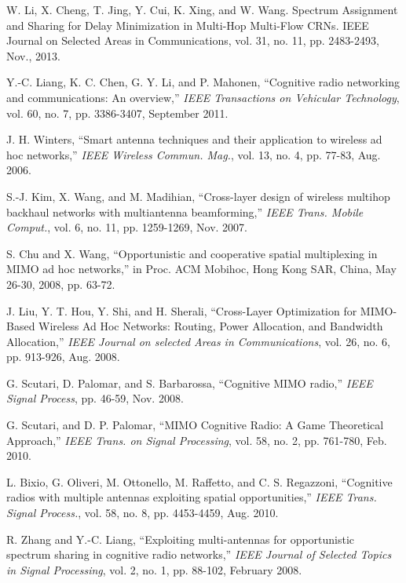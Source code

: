 \documentclass[12pt,onecolumn,tworows]{IEEEtran}
\begin{document}
\begin{thebibliography}{1}
W. Li, X. Cheng, T. Jing, Y. Cui, K. Xing, and W. Wang. Spectrum Assignment and Sharing for Delay Minimization in Multi-Hop Multi-Flow CRNs. IEEE Journal on Selected Areas in Communications, vol. 31, no. 11, pp. 2483-2493, Nov., 2013.

Y.-C. Liang, K. C. Chen, G. Y. Li, and P. Mahonen, ``Cognitive radio networking and communications: An overview,'' {\em IEEE Transactions on Vehicular Technology}, vol. 60, no. 7, pp. 3386-3407, September 2011.





J. H. Winters,  ``Smart antenna techniques and their application to
wireless ad hoc networks,'' {\em IEEE Wireless Commun. Mag.}, vol. 13, no. 4,
pp. 77-83, Aug. 2006.



S.-J. Kim, X. Wang, and M. Madihian, ``Cross-layer design of wireless
multihop backhaul networks with multiantenna beamforming,'' {\em IEEE
Trans. Mobile Comput.}, vol. 6, no. 11, pp. 1259-1269, Nov. 2007.


S. Chu and X. Wang, ``Opportunistic and cooperative spatial multiplexing in MIMO ad hoc networks,'' in Proc. ACM Mobihoc, Hong Kong
SAR, China, May 26-30, 2008, pp. 63-72.



J. Liu, Y. T. Hou, Y. Shi, and H. Sherali, ``Cross-Layer Optimization for MIMO-Based Wireless Ad Hoc Networks: Routing, Power Allocation, and Bandwidth Allocation,'' {\em IEEE Journal on selected Areas in Communications}, vol. 26, no. 6, pp. 913-926, Aug. 2008.



G. Scutari, D. Palomar, and S. Barbarossa, ``Cognitive MIMO radio,'' {\em IEEE Signal Process}, pp. 46-59, Nov. 2008.

G. Scutari, and D. P. Palomar, ``MIMO Cognitive Radio: A Game Theoretical Approach,'' {\em IEEE Trans. on Signal Processing}, vol. 58, no. 2, pp. 761-780, Feb. 2010.

L. Bixio, G. Oliveri, M. Ottonello, M. Raffetto, and C. S. Regazzoni, ``Cognitive radios with multiple antennas exploiting spatial opportunities,'' {\em IEEE Trans. Signal Process.}, vol. 58, no. 8, pp. 4453-4459, Aug. 2010.

R. Zhang and Y.-C. Liang, ``Exploiting multi-antennas for opportunistic spectrum sharing in cognitive radio networks,'' {\em IEEE Journal of Selected Topics in Signal Processing}, vol. 2, no. 1, pp. 88-102, February 2008.


\end{thebibliography}
\end{document}
